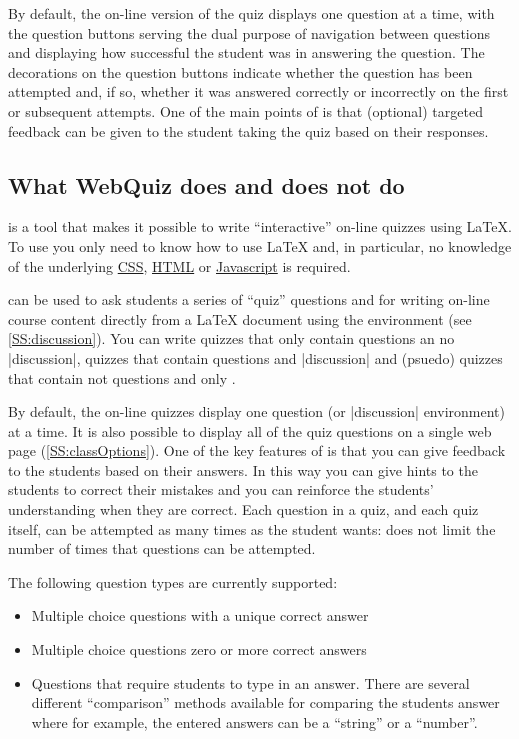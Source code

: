 \documentclass[svgnames]{article}
\newcommand{\HTML}{\href{https://www.w3schools.com/html/html_intro.asp}{HTML}\xspace}
\newcommand\CSS{\href{https://www.w3schools.com/css}{CSS}\xspace}
\newcommand\Javascript{\href{https://www.w3schools.com/Js/}{Javascript}\xspace}
\begin{document}
      By default, the on-line version of the quiz displays one question at
      a time, with the question buttons serving the dual purpose of
      navigation between questions and displaying how successful the
      student was in answering the question. The decorations on the
      question buttons indicate whether the question has been attempted
      and, if so, whether it was answered correctly or incorrectly on the
      first or subsequent attempts. One of the main points of \WebQuiz is
      that (optional) targeted feedback can be given to the student taking
      the quiz based on their responses.

  \subsection{What WebQuiz does and does not do}

      \WebQuiz is a tool that makes it possible to write ``interactive''
      on-line quizzes using \LaTeX{}. To use \WebQuiz you only need to
      know how to use \LaTeX{} and, in particular, no knowledge of the
      underlying \CSS, \HTML or \Javascript is required.

      \WebQuiz can be used to ask students a series of ``quiz'' questions
      and for writing on-line course content directly from a \LaTeX{}
      document using the \WebQuiz {} environment (see
      \autoref{SS:discussion}). You can write \WebQuiz quizzes that only
      contain questions an no \LatexCode|discussion|, quizzes that contain
      questions and \LatexCode|discussion| and (psuedo) quizzes that
      contain not questions and only .

      By default, the on-line quizzes display one question (or
      \LatexCode|discussion| environment) at a time.  It is also possible
      to display all of the quiz questions on a single web page
      (\autoref{SS:classOptions}). One of the key features of \WebQuiz is
      that you can give feedback to the students based on their answers.
      In this way you can give hints to the students to correct their
      mistakes and you can reinforce the students' understanding when they
      are correct. Each question in a quiz, and each quiz itself, can be
      attempted as many times as the student wants: \WebQuiz does not
      limit the number of times that questions can be attempted.

      The following question types are currently supported:
      \begin{itemize}
        \item Multiple choice questions with a unique correct answer
        \item Multiple choice questions zero or more correct answers
        \item Questions that require students to type in an answer. There
        are several different ``comparison'' methods available for
        comparing the students answer where
        for example, the entered answers can be a ``string'' or a ``number''.
      \end{itemize}
\end{document}
